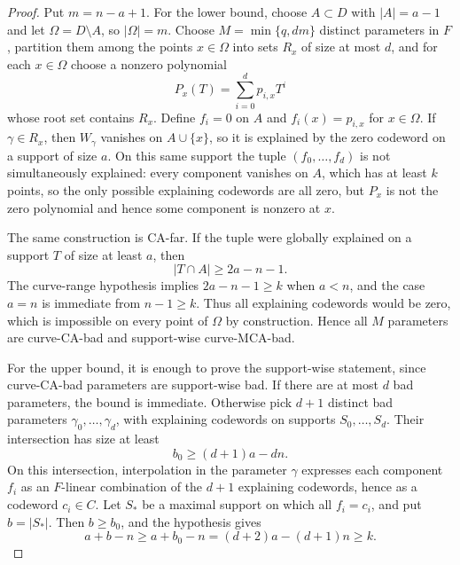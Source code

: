 \begin{proof}
Put \(m=n-a+1\).  For the lower bound, choose \(A\subset D\) with
\(|A|=a-1\) and let \(\Omega=D\setminus A\), so \(|\Omega|=m\).  Choose
\(M=\min\{q,dm\}\) distinct parameters in \(F\), partition them among the
points \(x\in\Omega\) into sets \(R_x\) of size at most \(d\), and for each
\(x\in\Omega\) choose a nonzero polynomial
\[
  P_x(T)=\sum_{i=0}^d p_{i,x}T^i
\]
whose root set contains \(R_x\).  Define \(f_i=0\) on \(A\) and
\(f_i(x)=p_{i,x}\) for \(x\in\Omega\).  If \(\gamma\in R_x\), then
\(W_\gamma\) vanishes on \(A\cup\{x\}\), so it is explained by the zero codeword
on a support of size \(a\).  On this same support the tuple
\((f_0,\ldots,f_d)\) is not simultaneously explained: every component vanishes
on \(A\), which has at least \(k\) points, so the only possible explaining
codewords are all zero, but \(P_x\) is not the zero polynomial and hence some
component is nonzero at \(x\).

The same construction is CA-far.  If the tuple were globally explained on a
support \(T\) of size at least \(a\), then
\[
  |T\cap A|\ge 2a-n-1.
\]
The curve-range hypothesis implies \(2a-n-1\ge k\) when \(a<n\), and the case
\(a=n\) is immediate from \(n-1\ge k\).  Thus all explaining codewords would be
zero, which is impossible on every point of \(\Omega\) by construction.  Hence
all \(M\) parameters are curve-CA-bad and support-wise curve-MCA-bad.

For the upper bound, it is enough to prove the support-wise statement, since
curve-CA-bad parameters are support-wise bad.  If there are at most \(d\) bad
parameters, the bound is immediate.  Otherwise pick \(d+1\) distinct bad
parameters \(\gamma_0,\ldots,\gamma_d\), with explaining codewords on supports
\(S_0,\ldots,S_d\).  Their intersection has size at least
\[
  b_0\ge (d+1)a-dn .
\]
On this intersection, interpolation in the parameter \(\gamma\) expresses each
component \(f_i\) as an \(F\)-linear combination of the \(d+1\) explaining
codewords, hence as a codeword \(c_i\in C\).  Let \(S_*\) be a maximal support
on which all \(f_i=c_i\), and put \(b=|S_*|\).  Then
\(b\ge b_0\), and the hypothesis gives
\[
  a+b-n\ge a+b_0-n=(d+2)a-(d+1)n\ge k .
\]


\end{proof}
